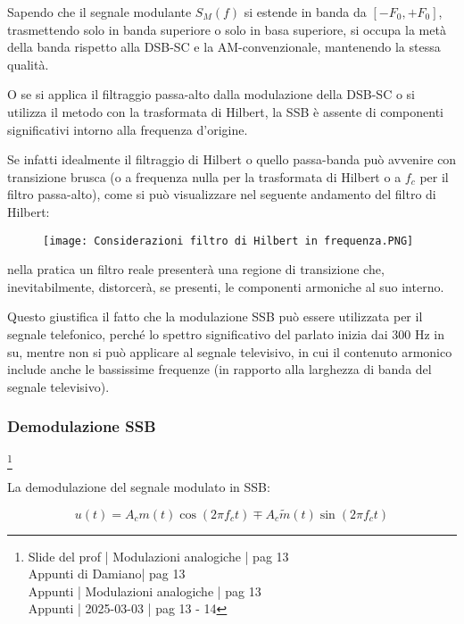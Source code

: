 Sapendo che il segnale modulante $S_M (f)$ si estende in banda da $[- F_0, +F_0]$, 
trasmettendo solo in banda superiore o solo in basa superiore, si occupa la metà della banda rispetto alla DSB-SC e la AM-convenzionale, 
mantenendo la stessa qualità. \newline 

O se si applica il filtraggio passa-alto dalla modulazione della DSB-SC o si utilizza il metodo con la trasformata di Hilbert, 
la SSB è assente di componenti significativi intorno alla frequenza d'origine. \newline 

Se infatti idealmente il filtraggio di Hilbert o quello passa-banda può avvenire con transizione brusca (o a frequenza nulla per la trasformata di Hilbert o a $f_c$ per il filtro passa-alto), 
come si può visualizzare nel seguente andamento del filtro di Hilbert: 

\begin{figure}[h]
    \centering
    \texttt{[image: Considerazioni filtro di Hilbert in frequenza.PNG]}
\end{figure} 

nella pratica un filtro reale presenterà una regione di transizione che, inevitabilmente, distorcerà, se presenti, le componenti armoniche al suo interno. \newline 

Questo giustifica il fatto che la modulazione SSB può essere utilizzata per il segnale telefonico, perché lo spettro significativo del parlato inizia dai 300 Hz in su, 
mentre non si può applicare al segnale televisivo, in cui il contenuto armonico include anche le bassissime frequenze 
(in rapporto alla larghezza di banda del segnale televisivo). \newline 

\newpage 

\subsubsection{Demodulazione SSB}
\footnote{Slide del prof | Modulazioni analogiche | pag 13 \\  
Appunti di Damiano| pag 13 \\
Appunti | Modulazioni analogiche | pag 13 \\
Appunti | 2025-03-03 | pag 13 - 14
} 

La demodulazione del segnale modulato in SSB: 

{
    \Large 
    \begin{equation}
        u(t)
        =
        A_c m(t) \cos(2 \pi f_c t)
        \mp
        A_c \tilde{m}(t) \sin(2 \pi f_c t)
    \end{equation}
}

